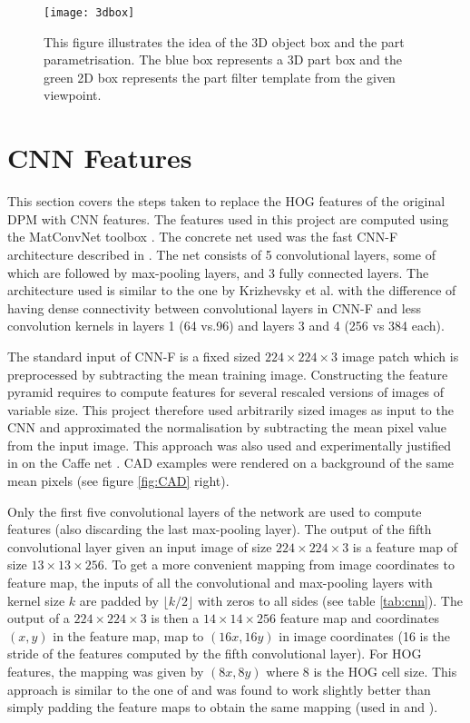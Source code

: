 \begin{figure}
\begin{center}
           \texttt{[image: 3dbox]}
\caption{This figure illustrates the idea of the 3D object box and the part parametrisation. The blue box represents a 3D part box and the green 2D box represents the part filter template from the given viewpoint.}
\label{fig:3dbox}
\end{center}
\end{figure}


\section{CNN Features}\label{sec:cnnFeat}
This section covers the steps taken to replace the HOG features of the original DPM with CNN features. The features used in this project are computed using the MatConvNet toolbox \cite{arXiv:1412.4564}. The concrete net used was the fast CNN-F architecture described in \cite{Chatfield14}. The net consists of 5 convolutional layers, some of which are followed by max-pooling layers, and 3 fully connected layers. The architecture used is similar to the one by Krizhevsky et al. \cite{krizhevsky2012imagenet} with the difference of having dense connectivity between convolutional layers in CNN-F and less convolution kernels in layers 1 (64 vs.96) and layers 3 and 4 (256 vs 384 each).

The standard input of CNN-F is a fixed sized $224\times224\times3$ image patch which is preprocessed by subtracting the mean training image. Constructing the feature pyramid requires to compute features for several rescaled versions of images of variable size. This project therefore used arbitrarily sized images as input to the CNN and approximated the normalisation by subtracting the mean pixel value from the input image. This approach was also used and experimentally justified in \cite{DBLP:journals/corr/IandolaMKGDK14} on the Caffe net \cite{jia2014caffe}. CAD examples were rendered on a background of the same mean pixels (see figure \ref{fig:CAD} right). 

Only the first five convolutional layers of the network are used to compute features (also discarding the last max-pooling layer). The output of the fifth convolutional layer given an input image of size $224\times224\times3$ is a feature map of size $13\times13\times256$. To get a more convenient mapping from image coordinates to feature map, the inputs of all the convolutional and max-pooling layers with kernel size $k$ are padded by $\lfloor k/2\rfloor$ with zeros to all sides (see table \ref{tab:cnn}). The output of a $224\times224\times3$ is then a $14\times14\times256$ feature map and coordinates $(x,y)$ in the feature map, map to $(16x,16y)$ in image coordinates (16 is the stride of the features computed by the fifth convolutional layer). For HOG features, the mapping was given by $(8x,8y)$ where 8 is the HOG cell size. This approach is similar to the one of \cite{girshick2014deformable} and was found to work slightly better than simply padding the feature maps to obtain the same mapping (used in \cite{DBLP:journals/corr/IandolaMKGDK14} and \cite{savalle8deformable}).

